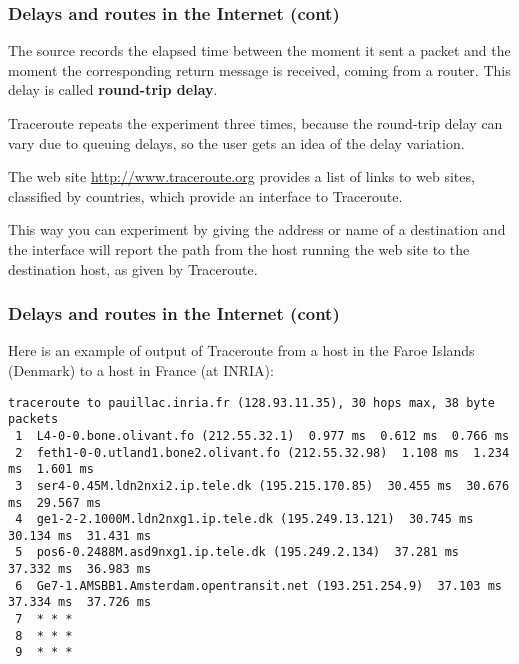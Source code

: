 %
\begin{frame}
\frametitle{Delays and routes in the Internet (cont)}

The source records the elapsed time between the moment it sent a
packet and the moment the corresponding return message is received,
coming from a router. This delay is called \textbf{round-trip delay}.

\bigskip

\textsf{Traceroute} repeats the experiment three times, because the
round-trip delay can vary due to queuing delays, so the user gets an
idea of the delay variation.

\bigskip

The web site \url{http://www.traceroute.org} provides a list of links
to web sites, classified by countries, which provide an interface to
\textsf{Traceroute}. 

\bigskip

This way you can experiment by giving the address or name of a
destination and the interface will report the path from the host
running the web site to the destination host, as given by
\textsf{Traceroute}.

\end{frame}

%
\begin{frame}[containsverbatim]
\frametitle{Delays and routes in the Internet (cont)}

Here is an example of output of \textsf{Traceroute} from a host in the
Faroe Islands (Denmark) to a host in France (at INRIA):
{\tiny
\begin{verbatim}
traceroute to pauillac.inria.fr (128.93.11.35), 30 hops max, 38 byte packets
 1  L4-0-0.bone.olivant.fo (212.55.32.1)  0.977 ms  0.612 ms  0.766 ms
 2  feth1-0-0.utland1.bone2.olivant.fo (212.55.32.98)  1.108 ms  1.234 ms  1.601 ms
 3  ser4-0.45M.ldn2nxi2.ip.tele.dk (195.215.170.85)  30.455 ms  30.676 ms  29.567 ms
 4  ge1-2-2.1000M.ldn2nxg1.ip.tele.dk (195.249.13.121)  30.745 ms  30.134 ms  31.431 ms
 5  pos6-0.2488M.asd9nxg1.ip.tele.dk (195.249.2.134)  37.281 ms  37.332 ms  36.983 ms
 6  Ge7-1.AMSBB1.Amsterdam.opentransit.net (193.251.254.9)  37.103 ms  37.334 ms  37.726 ms
 7  * * *
 8  * * *
 9  * * *
\end{verbatim}
}

\end{frame}

